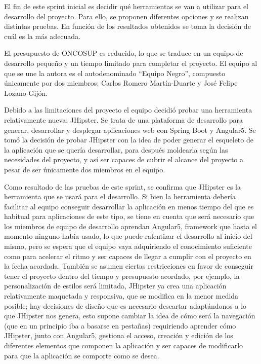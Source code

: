 El fin de este sprint inicial es decidir qué herramientas se van a utilizar para el desarrollo del proyecto. Para ello, se proponen diferentes opciones y se realizan distintas pruebas. En función de los resultados obtenidos se toma la decisión de cuál es la más adecuada. 

El presupuesto de ONCOSUP es reducido, lo que se traduce en un equipo de desarrollo pequeño y un tiempo limitado para completar el proyecto. El equipo al que se une la autora es el autodenominado ``Equipo Negro'', compuesto únicamente por dos miembros: Carlos Romero Martín-Duarte y José Felipe Lozano Gijón. 

Debido a las limitaciones del proyecto el equipo decidió probar una herramienta relativamente nueva: JHipster. Se trata de una plataforma de desarrollo para generar, desarrollar y desplegar aplicaciones web con Spring Boot y Angular5. Se tomó la decisión de probar JHipster con la idea de poder generar el esqueleto de la aplicación que se quería desarrollar, para después moldearla según las necesidades del proyecto, y así ser capaces de cubrir el alcance del proyecto a pesar de ser únicamente dos miembros en el equipo.

Como resultado de las pruebas de este sprint, se confirma que JHipster es la herramienta que se usará para el desarrollo. Si bien la herramienta debería facilitar al equipo conseguir desarrollar la aplicación en menos tiempo del que es habitual para aplicaciones de este tipo, se tiene en cuenta que será necesario que los miembros de equipo de desarrollo aprendan Angular5, framework que hasta el momento ninguno había usado, lo que puede ralentizar el desarrollo al inicio del mismo, pero se espera que el equipo vaya adquiriendo el conocimiento suficiente como para acelerar el ritmo y ser capaces de llegar a cumplir con el proyecto en la fecha acordada. También se asumen ciertas restricciones en favor de conseguir tener el proyecto dentro del tiempo y presupuesto acordado, por ejemplo, la personalización de estilos será limitada, JHipster ya crea una aplicación relativamente maquetada y responsiva, que se modifica en la menor medida posible; hay decisiones de diseño que es necesario descartar adaptándonos a lo que JHipster nos genera, esto supone cambiar la idea de cómo será la navegación (que en un principio iba a basarse en pestañas) requiriendo aprender cómo JHipster, junto con Angular5, gestiona el acceso, creación y edición de los diferentes elementos que componen la aplicación y ser capaces de modificarlo para que la aplicación se comporte como se desea.

